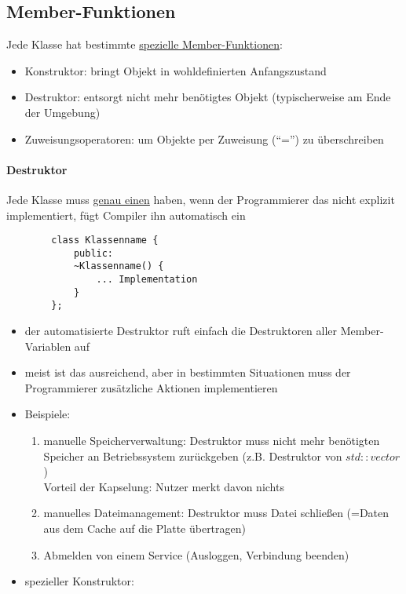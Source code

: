 \documentclass{article}
\begin{document}
\subsection{Member-Funktionen}
	Jede Klasse hat bestimmte \underline{spezielle Member-Funktionen}:
	\begin{itemize}
		\item Konstruktor: bringt Objekt in wohldefinierten Anfangszustand
		\item Destruktor: entsorgt nicht mehr benötigtes Objekt (typischerweise am Ende der Umgebung)
		\item Zuweisungsoperatoren: um Objekte per Zuweisung (``='') zu überschreiben
	\end{itemize}

\paragraph{Destruktor}
	Jede Klasse muss \underline{genau einen} haben, wenn der Programmierer das nicht explizit implementiert, fügt Compiler ihn automatisch ein
	\begin{lstlisting}
		class Klassenname {
			public:
			~Klassenname() {
				... Implementation
			}
		};
	\end{lstlisting}

	\begin{itemize}
		\item der automatisierte Destruktor ruft einfach die Destruktoren aller Member-Variablen auf
		\item meist ist das ausreichend, aber in bestimmten Situationen muss der Programmierer zusätzliche Aktionen implementieren
		\item Beispiele:
		\begin{enumerate}
			\item manuelle Speicherverwaltung: Destruktor muss nicht mehr benötigten Speicher an Betriebssystem zurückgeben (z.B. Destruktor von $std::vector$) \\
			Vorteil der Kapselung: Nutzer merkt davon nichts
			\item manuelles Dateimanagement: Destruktor muss Datei schließen (=Daten aus dem Cache auf die Platte übertragen)
			\item Abmelden von einem Service (Ausloggen, Verbindung beenden)
		\end{enumerate}
		\item spezieller Konstruktor:
	\end{itemize}
\end{document}
